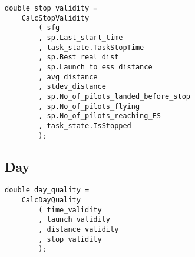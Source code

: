 \documentclass[gap.tex]{subfiles}
\begin{document}
\begin{lstlisting}
double stop_validity =
    CalcStopValidity
        ( sfg
        , sp.Last_start_time
        , task_state.TaskStopTime
        , sp.Best_real_dist
        , sp.Launch_to_ess_distance
        , avg_distance
        , stdev_distance
        , sp.No_of_pilots_landed_before_stop
        , sp.No_of_pilots_flying
        , sp.No_of_pilots_reaching_ES
        , task_state.IsStopped
        );
\end{lstlisting}

\subsection{Day}

\begin{lstlisting}
double day_quality =
    CalcDayQuality
        ( time_validity
        , launch_validity
        , distance_validity
        , stop_validity
        );
\end{lstlisting}
\end{document}
